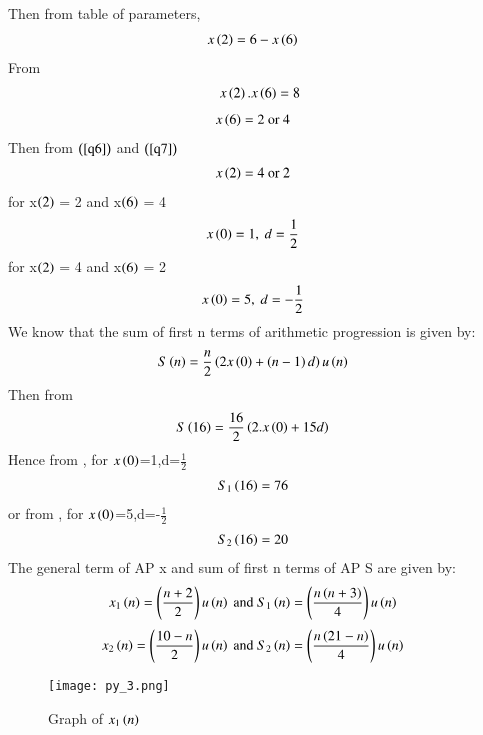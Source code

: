\documentclass[beamer]{IEEEtran}
\theoremstyle{remark}
\begin{document}
Then from table of parameters,
\begin{align}
\label{q6}
    x\left(2\right)&=6-x\left(6\right)
\end{align}
From \brak{\ref{q6}}
\begin{align}
x\left(2\right).x\left(6\right)=8
\end{align}
\begin{align}
\label{q7}
    x\left(6\right)&=2\ \text{or}\ 4
\end{align}
Then from $\left(\ref{q6}\right)$ and $\left(\ref{q7}\right)$
\begin{align}
\label{q8}
    x\left(2\right)&=4\ \text{or}\ 2
\end{align}
for x$\left(2\right)$ = 2 and x$\left(6\right)$ = 4
\begin{align}
x\left(0\right)&=1,\ d=\frac{1}{2}
\end{align}
for x$\left(2\right)$ = 4 and x$\left(6\right)$ = 2
\begin{align}
x\left(0\right)&=5,\ d=-\frac{1}{2}
\end{align}
We know that the sum of first n terms of arithmetic progression is given by:
\begin{align}
\label{q9}
S\left(n\right)&= \frac{n}{2}\left(2x\left(0\right)+\left(n-1\right)d\right)u\left(n\right)
\end{align}
Then from \brak{\ref{q9}}
\begin{align}
\label{q10}
S\left(16\right)&= \frac{16}{2}\left(2.x\left(0\right)+15d\right)
\end{align}
Hence from \brak{\ref{q10}},
for $x\left(0\right)$=1,d=$\frac{1}{2}$
\begin{align}
\label{11}
S_1\left(16\right)&=76
\end{align}
or from \brak{\ref{q10}},
for $x\left(0\right)$=5,d=-$\frac{1}{2}$
\begin{align}
\label{12}
S_2\left(16\right)&=20
\end{align}
The general term of AP x and sum of first n terms of AP S are given by:
\begin{align}
x_1\brak{n}&=\brak{\frac{n+2}{2}}u\brak{n}\ \text{and}\ S_1\brak{n}=\brak{\frac{n\brak{n+3}}{4}}u\brak{n}
\end{align}
\begin{align}
x_2\brak{n}&=\brak{\frac{10-n}{2}}u\brak{n}\ \text{and}\ S_2\brak{n}=\brak{\frac{n\brak{21-n}}{4}}u\brak{n}
\end{align}

\begin{figure}[h]
    \centering
    \texttt{[image: py\_3.png]}
    \label{fig:x1n}
    \caption*{Graph of $x_1\left(n\right)$}
\end{figure}
\end{document}
